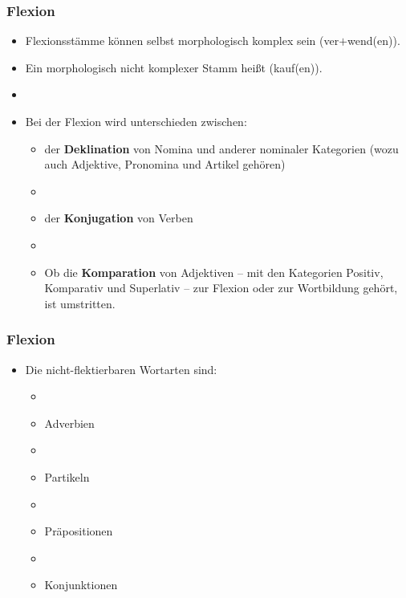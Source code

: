 
\begin{frame}
\frametitle{Flexion}

\begin{itemize}
\item Flexionsstämme können selbst morphologisch komplex sein (ver$+$wend(en)).
\item Ein morphologisch nicht komplexer Stamm heißt  (kauf(en)).
\item[] 
\item Bei der Flexion wird unterschieden zwischen:

\begin{itemize}
	\item der \textbf{Deklination} von Nomina und anderer nominaler Kategorien (wozu auch Adjektive, Pronomina und Artikel gehören)
	\item[]
	\item der \textbf{Konjugation} von Verben 
	\item[]
	\item Ob die \textbf{Komparation} von Adjektiven -- mit den Kategorien Positiv, Komparativ und Superlativ -- zur Flexion oder zur Wortbildung gehört, ist umstritten.
\end{itemize}

\end{itemize}

\end{frame}




\begin{frame}
\frametitle{Flexion}

\begin{itemize}
\item Die nicht-flektierbaren Wortarten sind:

\begin{itemize}
\item[]
\item Adverbien
\item[]
\item Partikeln
\item[]
\item Präpositionen
\item[]
\item Konjunktionen
\end{itemize}
\end{itemize}


\end{frame}



